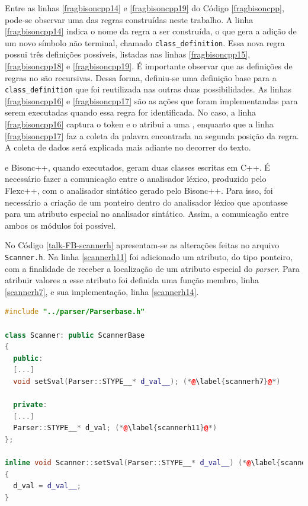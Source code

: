 Entre as linhas \ref{fragbisoncpp14} e \ref{fragbisoncpp19} do Código
\ref{fragbisoncpp}, pode-se observar uma das regras construídas neste trabalho.
A linha \ref{fragbisoncpp14} indica o nome da regra a ser construída, o que
gera a adição de um novo símbolo não terminal, chamado
\lstinline|class_definition|. Essa nova regra possui três definições possíveis,
listadas nas linhas \ref{fragbisoncpp15}, \ref{fragbisoncpp18} e
\ref{fragbisoncpp19}. É importante observar que as definições de regras no
\bisoncpp são recursivas. Dessa forma, definiu-se uma definição base para a
\lstinline|class_definition| que foi reutilizada nas outras duas possibilidades.
As linhas \ref{fragbisoncpp16} e \ref{fragbisoncpp17} são as ações que foram
implementandas para serem executadas quando essa regra for identificada.
No caso, a linha \ref{fragbisoncpp16} captura o token e o atribui a uma \str,
enquanto que a linha \ref{fragbisoncpp17} faz a coleta da
palavra encontrada na segunda posição da regra. A coleta de dados será explicada mais
adiante no decorrer do texto.

\flexcpp e \textsf{Bisonc++}, quando executados, geram duas classes escritas
em C++.
É necessário fazer a comunicação entre o analisador léxico, produzido pelo
\textsf{Flexc++}, com o analisador sintático gerado pelo \textsf{Bisonc++}.
Para isso, foi necessário a criação de um ponteiro dentro do analisador
léxico que apontasse para um atributo especial no analisador sintático.
Assim, a comunicação entre ambos os módulos foi possível.

No Código \ref{talk-FB-scannerh} apresentam-se as alterações feitas no
arquivo \lstinline|Scanner.h|. Na linha \ref{scannerh11} foi adicionado um atributo,
do tipo ponteiro, com a finalidade de receber a localização de um atributo especial
do \textit{parser}. Para atribuir valores a esse atributo foi definida uma
função membro, linha \ref{scannerh7}, e sua implementação, linha \ref{scannerh14}.
\begin{lstlisting}[language=C++, label=talk-FB-scannerh, caption=Alterações no Scanner.h para comunicação entre Analisador Léxico e Sintático]
#include "../parser/Parserbase.h"

class Scanner: public ScannerBase
{
  public:
  [...]
  void setSval(Parser::STYPE__* d_val__); (*@\label{scannerh7}@*)

  private:
  [...]
  Parser::STYPE__* d_val; (*@\label{scannerh11}@*)
};

inline void Scanner::setSval(Parser::STYPE__* d_val__) (*@\label{scannerh14}@*)
{
  d_val = d_val__;
}
\end{lstlisting}

